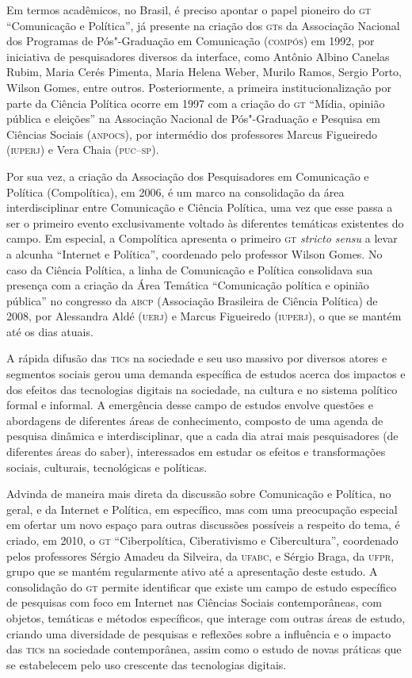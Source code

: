 Em termos acadêmicos, no Brasil, é preciso apontar o papel pioneiro do
\textsc{gt} ``Comunicação e Política'', já presente na criação dos \textsc{gt}s da
Associação Nacional dos Programas de Pós"-Graduação em Comunicação
(\textsc{compós}) em 1992, por iniciativa de pesquisadores diversos da interface,
como Antônio Albino Canelas Rubim, Maria Cerés Pimenta, Maria Helena
Weber, Murilo Ramos, Sergio Porto, Wilson Gomes, entre outros.
Posteriormente, a primeira institucionalização por parte da Ciência
Política ocorre em 1997 com a criação do \textsc{gt} ``Mídia, opinião pública e
eleições'' na Associação Nacional de Pós"-Graduação e Pesquisa em
Ciências Sociais (\textsc{\textsc{anpocs}}), por intermédio dos professores Marcus
Figueiredo (\textsc{iuperj}) e Vera Chaia (\textsc{puc--sp}).

Por sua vez, a criação da Associação dos Pesquisadores em Comunicação e
Política (Compolítica), em 2006, é um marco na consolidação da área
interdisciplinar entre Comunicação e Ciência Política, uma vez que esse
passa a ser o primeiro evento exclusivamente voltado às diferentes
temáticas existentes do campo. Em especial, a Compolítica apresenta o
primeiro \textsc{gt} \emph{stricto sensu} a levar a alcunha ``Internet e
Política'', coordenado pelo professor Wilson Gomes. No caso da Ciência
Política, a linha de Comunicação e Política consolidava sua presença com
a criação da Área Temática ``Comunicação política e opinião pública'' no
congresso da \textsc{abcp} (Associação Brasileira de Ciência Política) de 2008,
por Alessandra Aldé (\textsc{uerj}) e Marcus Figueiredo (\textsc{iuperj}), o que se mantém
até os dias atuais.

A rápida difusão das \textsc{tic}s na sociedade e seu uso massivo por diversos
atores e segmentos sociais gerou uma demanda específica de estudos
acerca dos impactos e dos efeitos das tecnologias digitais na sociedade,
na cultura e no sistema político formal e informal. A emergência desse
campo de estudos envolve questões e abordagens de diferentes áreas de
conhecimento, composto de uma agenda de pesquisa dinâmica e
interdisciplinar, que a cada dia atrai mais pesquisadores (de diferentes
áreas do saber), interessados em estudar os efeitos e transformações
sociais, culturais, tecnológicas e políticas.

Advinda de maneira mais direta da discussão sobre Comunicação e
Política, no geral, e da Internet e Política, em específico, mas com uma
preocupação especial em ofertar um novo espaço para outras discussões
possíveis a respeito do tema, é criado, em 2010, o \textsc{gt} ``Ciberpolítica,
Ciberativismo e Cibercultura'', coordenado pelos professores Sérgio
Amadeu da Silveira, da \textsc{ufabc}, e Sérgio Braga, da \textsc{ufpr}, grupo que se
mantém regularmente ativo até a apresentação deste estudo. A
consolidação do \textsc{gt} permite identificar que existe um campo de estudo
específico de pesquisas com foco em Internet nas Ciências Sociais
contemporâneas, com objetos, temáticas e métodos específicos, que
interage com outras áreas de estudo, criando uma diversidade de
pesquisas e reflexões sobre a influência e o impacto das \textsc{tic}s na
sociedade contemporânea, assim como o estudo de novas práticas que se
estabelecem pelo uso crescente das tecnologias digitais.

